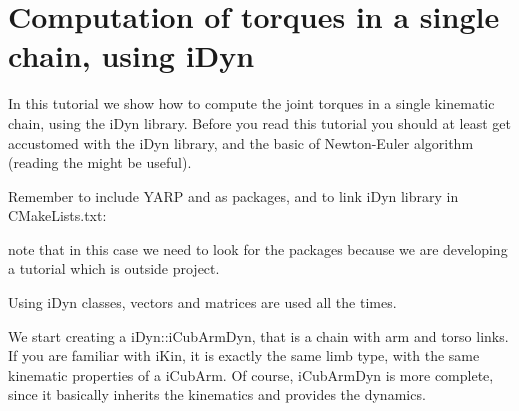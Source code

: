 \chapter{Computation of torques in a single chain, using i\+Dyn }
\hypertarget{idyn_one_chain_tutorial}{}\label{idyn_one_chain_tutorial}
In this tutorial we show how to compute the joint torques in a single kinematic chain, using the i\+Dyn library. Before you read this tutorial you should at least get accustomed with the i\+Dyn library, and the basic of Newton-\/\+Euler algorithm (reading the  might be useful).

Remember to include YARP and  as packages, and to link i\+Dyn library in CMake\+Lists.\+txt\+: 
\begin{DoxyCode}{0}

\end{DoxyCode}
 note that in this case we need to look for the packages because we are developing a tutorial which is outside  project.

Using i\+Dyn classes, vectors and matrices are used all the times. 
\begin{DoxyCode}{0}
\DoxyCodeLine{\textcolor{preprocessor}{\#include\ <yarp/sig/Vector.h>}}
\DoxyCodeLine{\textcolor{preprocessor}{\#include\ <yarp/sig/Matrix.h>}}

\end{DoxyCode}


We start creating a i\+Dyn\+::i\+Cub\+Arm\+Dyn, that is a chain with arm and torso links. If you are familiar with i\+Kin, it is exactly the same limb type, with the same kinematic properties of a i\+Cub\+Arm. Of course, i\+Cub\+Arm\+Dyn is more complete, since it basically inherits the kinematics and provides the dynamics. 
\begin{DoxyCode}{0}

\end{DoxyCode}


